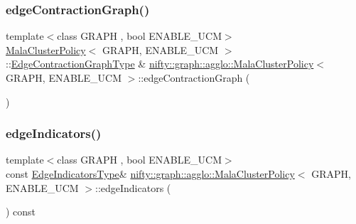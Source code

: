 \subsubsection{\texorpdfstring{edge\+Contraction\+Graph()}{edgeContractionGraph()}}
{\footnotesize\ttfamily template$<$class G\+R\+A\+PH , bool E\+N\+A\+B\+L\+E\+\_\+\+U\+CM$>$ \\
\hyperlink{classnifty_1_1graph_1_1agglo_1_1MalaClusterPolicy}{Mala\+Cluster\+Policy}$<$ G\+R\+A\+PH, E\+N\+A\+B\+L\+E\+\_\+\+U\+CM $>$\+::\hyperlink{classnifty_1_1graph_1_1agglo_1_1MalaClusterPolicy_a77a5b41304b53955aafbf214e2ad356f}{Edge\+Contraction\+Graph\+Type} \& \hyperlink{classnifty_1_1graph_1_1agglo_1_1MalaClusterPolicy}{nifty\+::graph\+::agglo\+::\+Mala\+Cluster\+Policy}$<$ G\+R\+A\+PH, E\+N\+A\+B\+L\+E\+\_\+\+U\+CM $>$\+::edge\+Contraction\+Graph (\begin{DoxyParamCaption}{ }\end{DoxyParamCaption})\hspace{0.3cm}{\ttfamily [inline]}}

\mbox{\label{classnifty_1_1graph_1_1agglo_1_1MalaClusterPolicy_acbdca1b5687d7aee6db6c5d98431cdad}} 
\subsubsection{\texorpdfstring{edge\+Indicators()}{edgeIndicators()}}
{\footnotesize\ttfamily template$<$class G\+R\+A\+PH , bool E\+N\+A\+B\+L\+E\+\_\+\+U\+CM$>$ \\
const \hyperlink{classnifty_1_1graph_1_1agglo_1_1MalaClusterPolicy_acc2c04742b370c093267afd17a14bb0c}{Edge\+Indicators\+Type}\& \hyperlink{classnifty_1_1graph_1_1agglo_1_1MalaClusterPolicy}{nifty\+::graph\+::agglo\+::\+Mala\+Cluster\+Policy}$<$ G\+R\+A\+PH, E\+N\+A\+B\+L\+E\+\_\+\+U\+CM $>$\+::edge\+Indicators (\begin{DoxyParamCaption}{ }\end{DoxyParamCaption}) const\hspace{0.3cm}{\ttfamily [inline]}}

\mbox{\label{classnifty_1_1graph_1_1agglo_1_1MalaClusterPolicy_a23f13c2b207f52ec47c137985eff2542}} 
